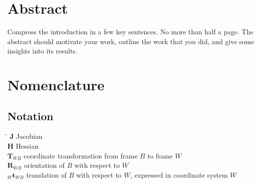 
 \setcounter{tocdepth}{2}
 \tableofcontents
 \cleardoublepage






\chapter*{Abstract}

  Compress the introduction in a few key sentences. No more than half a page. The abstract should motivate your work, outline the work that you did, and give some insights into its results.

 \cleardoublepage


\chapter*{Nomenclature}\label{chap:symbole}

\section*{Notation}
  \begin{tabbing}
    \hspace*{1.6cm}   \= \kill
    $\mathbf{J}$       \> Jacobian \\[0.5ex]
    $\mathbf{H}$       \> Hessian \\[0.5ex]
    $\mathbf{T}_{WB}$  \> coordinate transformation from frame $B$ to frame $W$ \\[0.5ex]
    $\mathbf{R}_{WB}$  \> orientation of $B$ with respect to $W$ \\[0.5ex]
    $_W\mathbf{t}_{WB}$\> translation of $B$ with respect to $W$, expressed in coordinate system $W$ \\[0.5ex]
  \end{tabbing}
  
